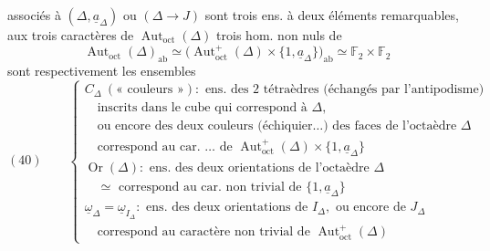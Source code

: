 \documentclass[11pt,a4paper]{article}
\begin{document}
\ill{} \ill{} \ill{} \ill{} associés à $(\Delta, \underline{a}_\Delta)$ ou $(\Delta \to J)$ sont \ill{} \ill{} trois ens. à deux éléments remarquables, \ill{} aux trois caractères  de $\operatorname{Aut}_{\mathrm{oct}}(\Delta)$ \ill{} trois hom. non nuls de 
\[
  \operatorname{Aut}_{\mathrm{oct}}(\Delta)_{\mathrm{ab}} \simeq \bigl(\operatorname{Aut}^+_{\mathrm{oct}}(\Delta) \times \{1, \underline{a}_\Delta\}\bigr)_{\mathrm{ab}} \simeq \mathbb{F}_2 \times \mathbb{F}_2
\]
sont respectivement les ensembles
\[
  (40) \qquad
  \left\{
  \begin{array}{l}
    C_\Delta \ (\text{« couleurs »}) : \text{ ens.\ des 2 tétraèdres (échangés par l'antipodisme)} \\
    \quad \text{inscrits dans le cube qui correspond à } \Delta, \\
    \quad \text{ou encore des deux couleurs (échiquier\ldots) des faces de l'octaèdre } \Delta \\
    \quad \text{correspond au car.\ \ldots\ de } \operatorname{Aut}^+_{\mathrm{oct}}(\Delta) \times \{1, \underline{a}_\Delta\} \\[4pt]
    \operatorname{Or}(\Delta) : \text{ ens.\ des deux orientations de l'octaèdre } \Delta \\
    \quad \simeq \text{ correspond au car.\ non trivial de } \{1, \underline{a}_\Delta\} \\[4pt]
    \underline{\omega}_\Delta = \underline{\omega}_{I_\Delta} : \text{ ens.\ des deux orientations de } I_\Delta,
      \text{ ou encore de } J_\Delta \\
    \quad \text{correspond au caractère non trivial de } \operatorname{Aut}^+_{\mathrm{oct}}(\Delta)
  \end{array}
  \right.
\]
\end{document}
